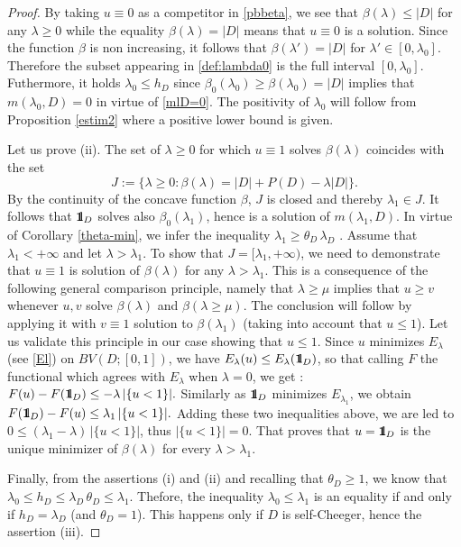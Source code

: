 \documentclass[reqno,11pt]{amsart}
\theoremstyle{definition}
\numberwithin{equation}{section}
\newcommand{\1}{{{\bf 1}\kern-0,28em\rm l}}
\newcommand{\one}{{{\bf 1}\kern-0,28em\rm l}}
\def\l{\lambda}
\begin{document}
\begin{proof} By taking $u\equiv 0$ as a competitor in \eqref{pbbeta}, we see that  $\beta(\l)\le |D|$ for any $\l\ge 0$ while the equality $\beta(\l)=|D|$ means that $u\equiv 0$
is a solution. Since the function $\beta$ is non increasing, it follows that $\beta(\l')=|D|$ for $\l'\in [0,\l_0]$. Therefore the subset appearing in \eqref{def:lambda0} is the full interval $[0,\l_0]$.
Futhermore, it holds  $\l_0\le h_D$ since $\beta_0(\l_0) \ge \beta(\l_0)=|D|$ implies that $m(\l_0, D) =0$ in virtue of \eqref{mlD=0}.
The positivity of $\l_0$ will follow from  Proposition \ref{estim2} where  a positive lower bound  is given.

Let us prove (ii). The set of $\l\ge 0$ for which  $u\equiv 1$ solves $\beta(\l)$ coincides  with the set 
$$J:=\{ \l\ge 0 : \beta(\l)=  |D| + P(D)-\l |D|\} .$$
 By the continuity of the concave function $\beta$, $J$ is closed and thereby  $\l_1\in J$.
It follows that $\one_D$ solves also $\beta_0(\l_1)$, hence  is a solution of $m(\l_1,D)$. In virtue of Corollary \ref{theta-min}, we 
infer the inequality $\l_1 \ge \theta_D\, \l_D$ .  Assume that $\l_1<+\infty$ and let $\l >\l_1$. 
To show that $J=[\l_1,+\infty)$, we need to demonstrate that $u\equiv 1$ is solution of $\beta(\l)$ for any $\l>\l_1$. This is a consequence of the following general comparison principle, namely that $\l \ge \mu$ implies that $u\ge v$ whenever $u, v$ solve $\beta(\l)$ and $\beta(\l\ge \mu)$. 
The conclusion will follow by applying it with $v\equiv 1$ solution to $\beta(\l_1)$ (taking into account that $u\le 1$).
Let us validate this principle in our case showing that $u\le 1$. Since $u$ minimizes  $E_\l$ (see \eqref{El}) on $BV(D;[0,1])$,
we have $E_\l(u) \le E_\l(\one_D)$, so that calling $F$ the functional which agrees with $E_\l$ when $\l=0$,  we get :
$  F(u)-F(\one_D) \le - \l \, | \{u<1\}| .$
Similarly as $\one_D$ minimizes $E_{\l_1}$, we obtain
$  F(\one_D) - F(u) \le   \l_1 \, | \{u<1\}|.$
Adding these two  inequalities above, we are led to\  $0\le (\l_1-\l)\,  |\{u<1\}|$, thus $|\{u<1\}|=0$. 
That proves that  $u=\one_ D$ is the unique minimizer of $\beta(\l)$ for every $\l>\l_1$.  

Finally, from the assertions (i) and (ii) and recalling that $\theta_D \ge 1$, we know  that 
$\l_0 \le h_D \le \l_D\, \theta_D\le \l_1$. Thefore, the inequality $\l_0\le \l_1$ is an equality if and only if $h_D=\lambda_D$ (and $\theta_D=1$).
This happens only if $D$ is self-Cheeger, hence the assertion (iii).

 






\end{proof}
\end{document}
